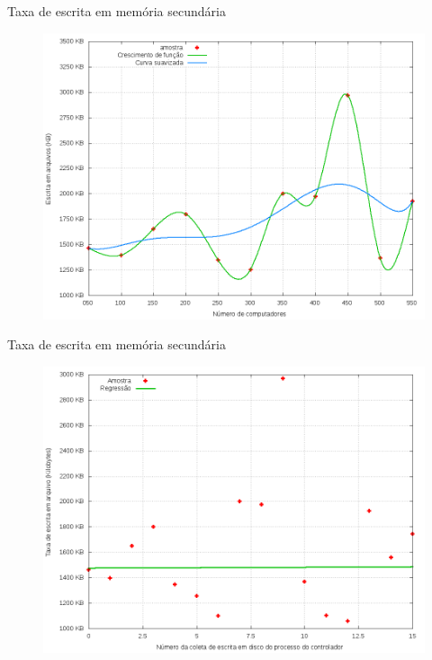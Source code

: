 \begin{frame}{Taxa de escrita em memória secundária}

    \begin{figure}[!htb]
        \centering
        \includegraphics[scale=.35]{images/writing-rate-growth}
    \end{figure}
\end{frame}



\begin{frame}{Taxa de escrita em memória secundária}

    \begin{figure}[!htb]
        \centering
        \includegraphics[scale=.35]{images/scatter-writing-rate}
    \end{figure}
\end{frame}
